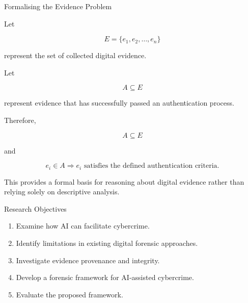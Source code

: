 \documentclass[aspectratio=169,11pt]{beamer}
\begin{document}
	\begin{frame}{Formalising the Evidence Problem}
		
		Let
		
		\[
		E = \{e_1,e_2,\ldots,e_n\}
		\]
		
		represent the set of collected digital evidence.
		
		Let
		
		\[
		A \subseteq E
		\]
		
		represent evidence that has successfully passed
		an authentication process.
		
		Therefore,
		
		\[
		A \subseteq E
		\]
		
		and
		
		\[
		e_i \in A
		\Rightarrow
		e_i \text{ satisfies the defined authentication criteria.}
		\]
		
		\vspace{0.5cm}
		
		This provides a formal basis for reasoning about
		digital evidence rather than relying solely on
		descriptive analysis.
		
	\end{frame}
	
	
	\begin{frame}{Research Objectives}
		
		\begin{enumerate}
			
			\item Examine how AI can facilitate cybercrime.
			
			\vspace{0.2cm}
			
			\item Identify limitations in existing digital forensic
			approaches.
			
			\vspace{0.2cm}
			
			\item Investigate evidence provenance and integrity.
			
			\vspace{0.2cm}
			
			\item Develop a forensic framework for AI-assisted
			cybercrime.
			
			\vspace{0.2cm}
			
			\item Evaluate the proposed framework.
			
		\end{enumerate}
		
	\end{frame}
	
\end{document}
